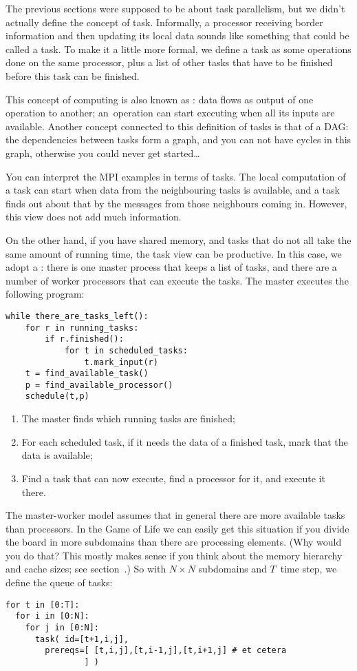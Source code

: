 The previous sections were supposed to be about task parallelism, but
we didn't actually define the concept of task. Informally, a processor
receiving border information and then updating its local data sounds
like something that could be called a task.  To make it a little
more formal, we define a task as some operations done on the same
processor, plus a list of other tasks that have to be finished before
this task can be finished.

This concept of computing is also known as : data
flows as output of one operation to another; an~operation can start
executing when all its inputs are available. Another concept connected
to this definition of tasks is that of a \acf{DAG}: the dependencies
between tasks form a graph, and you can not have cycles in this graph,
otherwise you could never get started\ldots

You can interpret the MPI examples in terms of tasks.
The local computation of a task can start when data from the
neighbouring tasks is available, and a task finds out about that
by the messages from those neighbours coming in. However, 
this view does not add much information.

On the other hand, if you have shared memory, and tasks that do not
all take the same amount of running time, the task view can be
productive. In this case, we adopt a :
there is one master process that keeps a list of tasks, and there are
a number of worker processors that can execute the tasks. The master executes
the following program:
\begin{verbatim}
while there_are_tasks_left():
    for r in running_tasks:
        if r.finished():
            for t in scheduled_tasks:
                t.mark_input(r)
    t = find_available_task()
    p = find_available_processor()
    schedule(t,p)
\end{verbatim}
\begin{enumerate}
\item The master finds which running tasks are finished;
\item For each scheduled task, if it needs the data of a finished
  task, mark that the data is available;
\item Find a task that can now execute, find a processor for it, and
  execute it there.
\end{enumerate}

The master-worker model assumes that in general there are more
available tasks than processors. In the Game of Life we can easily get
this situation if you divide the board in more subdomains than there
are processing elements. (Why would you do that? This mostly makes
sense if you think about the memory hierarchy and cache sizes; see
section~.) So with
$N\times N$ subdomains and $T$~time step, we define the queue
of tasks:
\begin{verbatim}
for t in [0:T]:
  for i in [0:N]:
    for j in [0:N]:
      task( id=[t+1,i,j], 
        prereqs=[ [t,i,j],[t,i-1,j],[t,i+1,j] # et cetera
                ] )
\end{verbatim}

